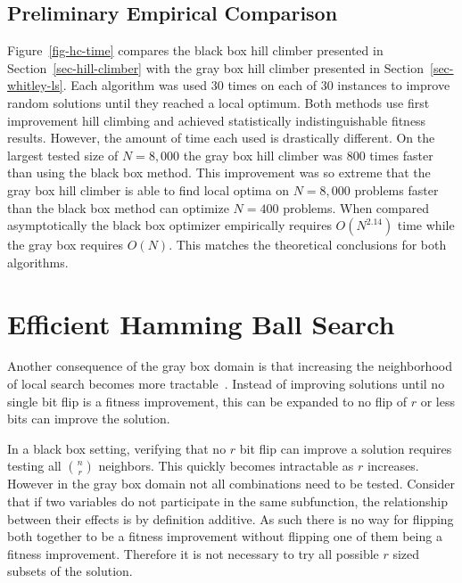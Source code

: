 \subsection{Preliminary Empirical Comparison}
Figure~\ref{fig-hc-time} compares the black box hill climber presented in Section~\ref{sec-hill-climber}
with the gray box hill climber presented in Section~\ref{sec-whitley-ls}.  Each algorithm was
used 30 times on each of 30 instances to improve random solutions until they reached a local optimum.
Both methods use first improvement hill climbing and achieved statistically indistinguishable fitness results.
However, the amount of time each used is drastically different. On the largest tested size of $N=8,000$ the gray box
hill climber was 800 times faster than using the black box method. This improvement was so extreme
that the gray box hill climber is able to find local optima on $N=8,000$ problems faster than the black box
method can optimize $N=400$ problems.  When compared asymptotically the black box optimizer empirically requires
$O(N^{2.14})$ time while the gray box requires $O(N)$. This matches the theoretical conclusions for both algorithms.

\section{Efficient Hamming Ball Search}
Another consequence of the gray box domain is that increasing the neighborhood of local search becomes
more tractable~\cite{chicano:2014:ball}.  Instead of improving solutions until no single bit flip
is a fitness improvement, this can be expanded to no flip of $r$ or less bits can improve the solution.

In a black box setting, verifying that no $r$ bit flip can improve a solution requires testing all
$n \choose r$ neighbors. This quickly becomes intractable as $r$ increases. However in the gray
box domain not all combinations need to be tested. Consider that if two variables do not participate
in the same subfunction, the relationship between their effects is by definition additive. As such
there is no way for flipping both together to be a fitness improvement without flipping one of them
being a fitness improvement. Therefore it is not necessary to try all possible $r$ sized subsets
of the solution.

